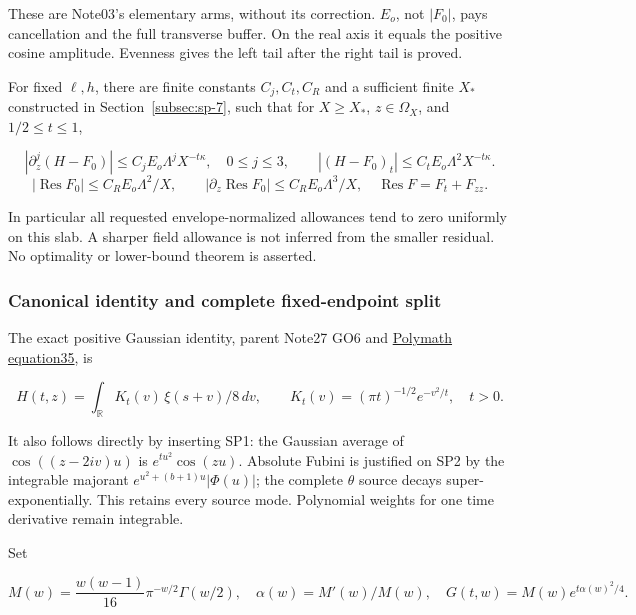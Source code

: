 These are Note03's elementary arms, without its correction. \(E_{o}\), not \(|F_0|\), pays cancellation and the full transverse buffer. On the real axis it equals the positive cosine amplitude. Evenness gives the left tail after the right tail is proved.

\begin{theorem}\label{thm:small-positive-slab}
 For fixed \(\ell,h\), there are finite constants \(C_{j},C_{t},C_{R}\) and a sufficient finite \(X_*\) constructed in Section~\ref{subsec:sp-7}, such that for \(X\ge X_*\), \(z\in \Omega_X\), and \(1/2\le t\le 1\),

\[
|\partial_z^j(H-F_0)|\le C_j E_o\Lambda^j X^{-t\kappa},
\quad 0\le j\le3,\qquad
|(H-F_0)_t|\le C_t E_o\Lambda^2X^{-t\kappa}.
\tag{SP4}\label{eq:ansatz-sp4}
\]
\[
|\operatorname{Res}F_0|\le C_R E_o\Lambda^2/X,\qquad
|\partial_z\operatorname{Res}F_0|\le C_R E_o\Lambda^3/X,
\quad\operatorname{Res}F=F_t+F_{zz}.
\tag{SP5}\label{eq:ansatz-sp5}
\]
\end{theorem}

In particular all requested envelope-normalized allowances tend to zero uniformly on this slab. A sharper field allowance is not inferred from the smaller residual. No optimality or lower-bound theorem is asserted.

\subsubsection{Canonical identity and complete fixed-endpoint split}
\label{subsec:sp-2}

The exact positive Gaussian identity, parent Note27 GO6 and \href{https://arxiv.org/html/1904.12438v2#S4}{Polymath equation35}, is

\[
H(t,z)=\int_{\mathbb R}K_t(v)\,\xi(s+v)/8\,dv,
\qquad K_t(v)=(\pi t)^{-1/2}e^{-v^2/t},\quad t>0.
\tag{SP6}\label{eq:ansatz-sp6}
\]

It also follows directly by inserting SP1: the Gaussian average of \(\cos((z-2iv)u)\) is \(e^{tu^{2}}\cos(zu)\). Absolute Fubini is justified on SP2 by the integrable majorant \(e^{u^{2}+(b+1)u}|\Phi(u)|\); the complete \(\theta\) source decays super-exponentially. This retains every source mode. Polynomial weights for one time derivative remain integrable.

Set

\[
M(w)=\frac{w(w-1)}{16}\pi^{-w/2}\Gamma(w/2),\quad
\alpha(w)=M'(w)/M(w),\quad G(t,w)=M(w)e^{t\alpha(w)^2/4}.
\tag{SP7}\label{eq:ansatz-sp7}
\]

